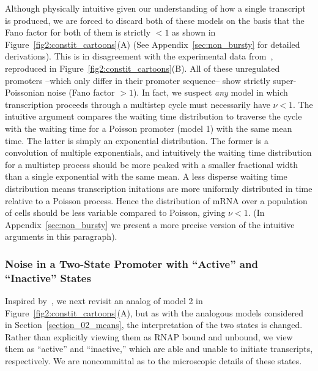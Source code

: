 Although physically intuitive given our understanding of how a single transcript
is produced, we are forced to discard both of these models on the basis that the
Fano factor for both of them is strictly $< 1$ as shown in
Figure~\ref{fig2:constit_cartoons}(A) (See Appendix~\ref{sec:non_bursty} for
detailed derivations). This is in disagreement with the experimental data
from~\cite{Jones2014}, reproduced in Figure~\ref{fig2:constit_cartoons}(B). All
of these unregulated promoters --which only differ in their promoter sequence--
show strictly super-Poissonian noise (Fano factor $> 1$). In fact, we suspect
\textit{any} model in which transcription proceeds through a multistep cycle
must necessarily have $\nu<1$. The intuitive argument compares the waiting time
distribution to traverse the cycle with the waiting time for a Poisson promoter
(model 1) with the same mean time. The latter is simply an exponential
distribution. The former is a convolution of multiple exponentials, and
intuitively the waiting time distribution for a multistep process should be more
peaked with a smaller fractional width than a single exponential with the same
mean. A less disperse waiting time distribution means transcription initations
are more uniformly distributed in time relative to a Poisson process. Hence the
distribution of mRNA over a population of cells should be less variable compared
to Poisson, giving $\nu<1$. (In Appendix~\ref{sec:non_bursty} we present a more
precise version of the intuitive arguments in this paragraph).




  




\subsubsection{Noise in a Two-State Promoter with ``Active'' and ``Inactive''
States}

Inspired by~\cite{Razo-Mejia2020}, we next revisit an analog of model 2 in
Figure~\ref{fig2:constit_cartoons}(A), but as with
the analogous models considered in Section~\ref{section_02_means},
the interpretation of the two
states is changed. Rather than explicitly viewing them as RNAP bound and
unbound, we view them as ``active'' and ``inactive,'' which are able and unable
to initiate transcripts, respectively. We are noncommittal as to the microscopic
details of these states.

